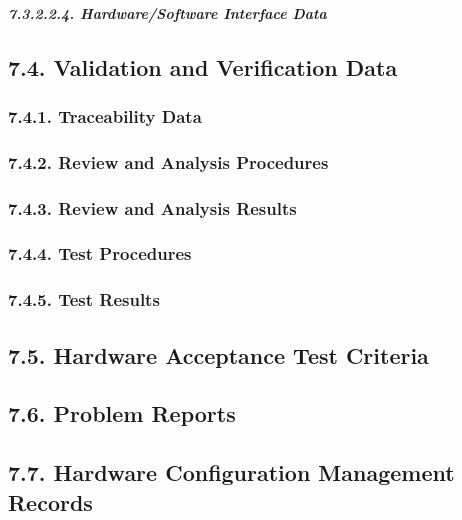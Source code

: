 \documentclass[]{article}
\let\oldsubparagraph\subparagraph
\renewcommand{\subparagraph}[1]{\oldsubparagraph{#1}\mbox{}}
\begin{document}
\subparagraph{7.3.2.2.4. Hardware/Software Interface
Data}\label{hardwaresoftware-interface-data}

\subsection{7.4. Validation and Verification
Data}\label{validation-and-verification-data}

\subsubsection{7.4.1. Traceability Data}\label{traceability-data}

\subsubsection{7.4.2. Review and Analysis
Procedures}\label{review-and-analysis-procedures}

\subsubsection{7.4.3. Review and Analysis
Results}\label{review-and-analysis-results}

\subsubsection{7.4.4. Test Procedures}\label{test-procedures}

\subsubsection{7.4.5. Test Results}\label{test-results}

\subsection{7.5. Hardware Acceptance Test
Criteria}\label{hardware-acceptance-test-criteria}

\subsection{7.6. Problem Reports}\label{problem-reports}

\subsection{7.7. Hardware Configuration Management
Records}\label{hardware-configuration-management-records}
\end{document}
